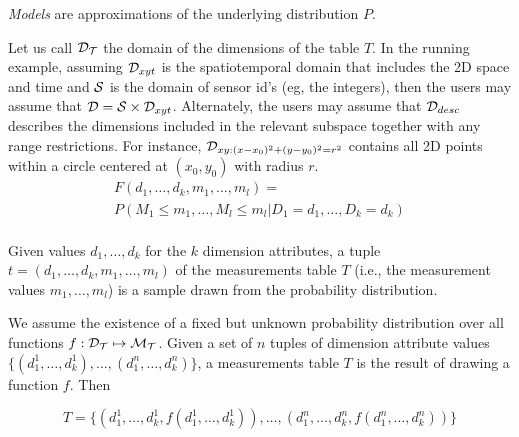 {\em Models} are approximations of the underlying distribution $P$.


Let us call ${\cal D_T}$ the domain of the dimensions of the table
$T$. In the running example, assuming ${\cal D}_{xyt}$ is the
spatiotemporal domain that includes the 2D space and time and ${\cal
  S}$ is the domain of sensor id's (eg, the integers), then the users
may assume that ${\cal D} = {\cal S} \times {\cal
  D}_{xyt}$. Alternately, the users may assume that ${\cal D}_{desc}$
describes the dimensions included in the relevant subspace together
with any range restrictions. For instance, ${\cal D}_{xy:
  (x-x_0)^2+(y-y_0)^2 = r^2}$ contains all 2D points within a circle
centered at $(x_0, y_0)$ with radius $r$. \\

\[ 
\begin{array}{l}
F(d_1, \ldots, d_k, m_1, \ldots, m_l) = \\
P(M_1 \leq m_1, \ldots, M_l \leq m_l | D_1 = d_1, \ldots, D_k = d_k) \\
\end{array}
\]

Given values $d_1,\ldots,d_k$ for the $k$ dimension attributes, a tuple $t=(d_1,\ldots,d_k,m_1,\ldots,m_l)$ of the measurements table $T$ (i.e., the measurement values $m_1, \ldots, m_l$) is a sample drawn from the probability distribution.  

 We assume the existence of a fixed but unknown probability distribution over all functions $f : {\cal D_T} \mapsto {\cal M_T}$. Given a set of $n$ tuples of dimension attribute values $\{(d_1^1,\ldots,d_k^1),\ldots,(d_1^n,\ldots,d_k^n)\}$, a measurements table $T$ is the result of drawing a function $f$. Then

\[
T =  \{(d_1^1,\ldots,d_k^1, f(d_1^1,\ldots,d_k^1)),\ldots,(d_1^n,\ldots,d_k^n,f(d_1^n,\ldots,d_k^n))\}
\]


